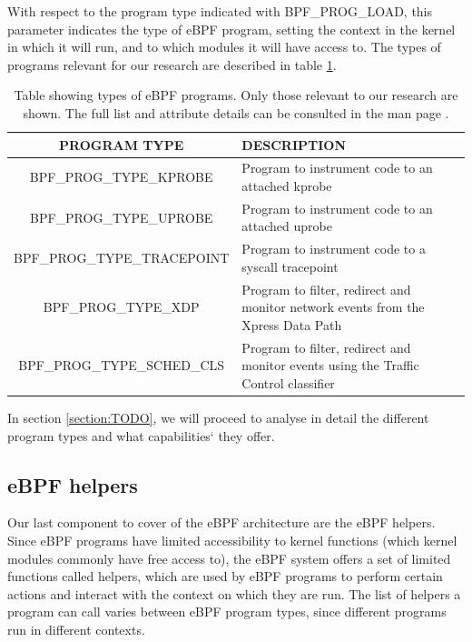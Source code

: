 \documentclass[12pt]{report} %
\begin{document}
With respect to the program type indicated with BPF\_PROG\_LOAD, this parameter indicates the type of eBPF program, setting the context in the kernel in which it will run, and to which modules it will have access to. The types of programs relevant for our research are described in table \ref{table:ebpf_prog_types}.

\begin{table}[H]
\begin{tabular}{|c|>{\centering\arraybackslash}p{5cm}|}
\hline
PROGRAM TYPE & DESCRIPTION\\
\hline
\hline
BPF\_PROG\_TYPE\_KPROBE & Program to instrument code to an attached kprobe\\
\hline
BPF\_PROG\_TYPE\_UPROBE & Program to instrument code to an attached uprobe\\
\hline
BPF\_PROG\_TYPE\_TRACEPOINT & Program to instrument code to a syscall tracepoint\\
\hline
BPF\_PROG\_TYPE\_XDP & Program to filter, redirect and monitor network events from the Xpress Data Path\\
\hline
BPF\_PROG\_TYPE\_SCHED\_CLS & Program to filter, redirect and monitor events using the Traffic Control classifier\\
\hline
\end{tabular}
\caption{Table showing types of eBPF programs. Only those relevant to our research are shown. The full list and attribute details can be consulted in the man page \cite{bpf_syscall}.}
\label{table:ebpf_prog_types}
\end{table}

In section \ref{section:TODO}, we will proceed to analyse in detail the different program types and what capabilities` they offer.

\subsection{eBPF helpers} \label{subsection:ebpf_helpers}
Our last component to cover of the eBPF architecture are the eBPF helpers. Since eBPF programs have limited accessibility to kernel functions (which kernel modules commonly have free access to), the eBPF system offers a set of limited functions called helpers\cite{ebpf_helpers}, which are used by eBPF programs to perform certain actions and interact with the context on which they are run. The list of helpers a program can call varies between eBPF program types, since different programs run in different contexts.
\end{document}
